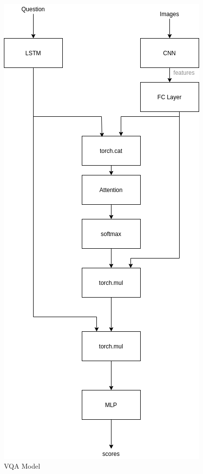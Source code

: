 
\begin{figure}[h]
     \centering
     \includegraphics[width=.5\textwidth]{./figure/baseline_diagram.png}
     \caption{VQA Model}
     \label{fig:baseline_model}
\end{figure}

